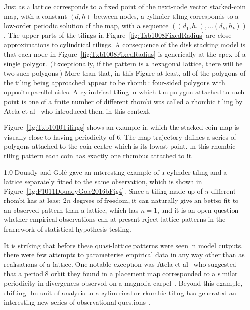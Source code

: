 Just as a lattice corresponds to a fixed point of the next-node vector stacked-coin map, with a constant $(d,h)$ between nodes, a cylinder tiling corresponds to a low-order periodic solution of the map, with a sequence $((d_1,h_1),\ldots (d_k,h_k) )$. The upper parts of the tilings in Figure~\ref{fig:Txb1008FixedRadius} are close approximations to cylindrical tilings.
A consequence of the disk stacking model is that each node in Figure~\ref{fig:Txb1008FixedRadius} is generically at the apex of a single polygon. (Exceptionally, if the pattern is a hexagonal lattice, there will be two such polygons.)
More than that, in this Figure at least, all of the polygons of the tiling being approached appear to be rhombi: four-sided polygons with opposite parallel sides.
A cylindrical tiling in which the polygon attached to each point is one of a finite number of different rhombi was called a rhombic tiling by Atela et al~\cite{atelaRhombicTilingsPrimordia2017} who introduced them in this context.

Figure~\ref{fig:Txb1010Tilings} shows an example in which the stacked-coin map is visually close to having periodicity of 6. The map trajectory defines a series of polygons attached to the coin centre which is its lowest point. In this rhombic-tiling pattern each coin has exactly one rhombus attached to it.


%
	{1.0} 
Douady and Gol\'e  gave an interesting example of a cylinder tiling and a lattice separately fitted to the same observation, which is shown in Figure~\ref{fig:F1011DouadyGole2016bFig4}. Since a tiling made up of $n$ different rhombi has at least $2n$ degrees of freedom, it can naturally give an better fit to an observed pattern than a lattice, which has $n=1$, and it is an open question whether empirical observations can at present reject lattice patterns in the framework of statistical hypothesis testing.%

It is striking that before these quasi-lattice patterns were seen in model outputs, there were few attempts to parameterise empirical data in any way other than as realisations of a lattice. One notable exception was Atela et al~\cite{atelaDynamicalSystemPlant2002} who suggested that a period 8 orbit they found in a placement map corresponded to a similar periodicity in divergences observed on a magnolia carpel~\cite{tuckerPhyllotaxisVascularOrganization1961}. 
Beyond this example, shifting the unit of analysis to a cylindrical or rhombic tiling has generated an interesting new series of observational questions~\autocite{douadyFibonacciQuasisymmetricPhyllotaxis2016}.


